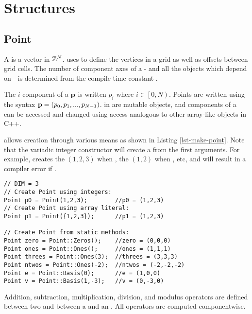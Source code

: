 \documentclass[12pt,a4paper]{article}
\begin{document}
\section{\libname Structures}

\subsection{Point}

A  is a vector in $\mathbb{Z}^N$. \libname uses  to define the vertices in a grid as well as offsets between grid cells. The number of component axes of a  - and all the objects which depend on  - is determined from the compile-time constant . 

The $i$ component of a  $\mathbf{p}$ is written $p_i$ where $i\in\left[0,N\right)$. Points are written using the syntax $\mathbf{p} = \left(p_0, p_1, ... , p_{N-1}\right)$.  in \libname are mutable objects, and components of a  can be accessed and changed using \code{[]} access analogous to other array-like objects in C++.

\libname allows  creation through various means as shown in Listing \ref{lst-make-point}. Note that the variadic integer constructor will create a  from the first  arguments. For example,  creates the  $(1,2,3)$ when , the  $(1,2)$ when , etc, and will result in a compiler error if .

\begin{lstlisting}[caption=Methods for Creating Points, label=lst-make-point]
// DIM = 3
// Create Point using integers:
Point p0 = Point(1,2,3);        //p0 = (1,2,3)
// Create Point using array literal:
Point p1 = Point({1,2,3});      //p1 = (1,2,3)

// Create Point from static methods:
Point zero = Point::Zeros();	//zero = (0,0,0)
Point ones = Point::Ones();		//ones = (1,1,1)
Point threes = Point::Ones(3);	//threes = (3,3,3)
Point ntwos = Point::Ones(-2);  //ntwos = (-2,-2,-2)
Point e = Point::Basis(0);		//e = (1,0,0)
Point v = Point::Basis(1,-3);	//v = (0,-3,0) 
\end{lstlisting}

Addition, subtraction, multiplication, division, and modulus operators are defined between two  and between a  and an . All operators are computed componentwise. 
\end{document}
